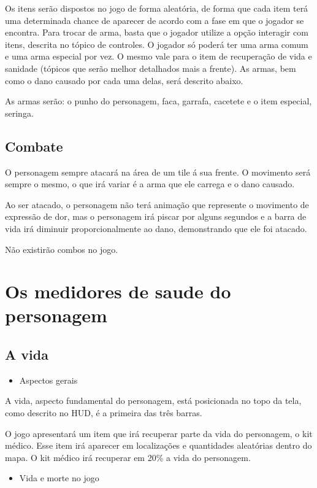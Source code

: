 \documentclass{article}
\begin{document}
Os itens serão dispostos no jogo de forma aleatória, de forma que cada item terá uma determinada chance de aparecer de acordo com a fase em que o jogador se encontra. Para trocar de arma, basta que o jogador utilize a opção interagir com itens, descrita no tópico de controles. O jogador só poderá ter uma arma comum e uma arma especial por vez. O mesmo vale para o item de recuperação de vida e sanidade (tópicos que serão melhor detalhados mais a frente). As armas, bem como o dano causado por cada uma delas, será descrito abaixo.

As armas serão: o punho do personagem, faca, garrafa, cacetete e o item especial, seringa.

\subsection{Combate}
O personagem sempre atacará na área de um tile á sua frente. O movimento será sempre o mesmo, o que irá variar é a arma que ele carrega e o dano causado.

Ao ser atacado, o personagem não terá animação que represente o movimento de expressão de dor, mas o personagem irá piscar por alguns segundos e a barra de vida irá diminuir proporcionalmente ao dano, demonstrando que ele foi atacado.

Não existirão combos no jogo.

\section{Os medidores de saude do personagem}
\subsection{A vida}
\begin{itemize}
\item Aspectos gerais
\end{itemize}

A vida, aspecto fundamental do personagem, está posicionada no topo da tela, como descrito no HUD, é a primeira das três barras.

O jogo apresentará um item que irá recuperar parte da vida do personagem, o kit  médico. Esse item irá aparecer em localizações e quantidades aleatórias dentro do mapa. O kit médico irá recuperar em 20\% a vida do personagem.

\begin{itemize}
\item Vida e morte no jogo
\end{itemize}
\end{document}
